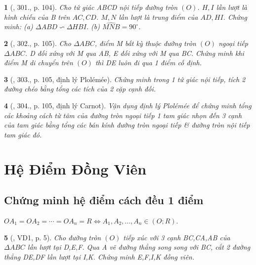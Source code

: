 \documentclass{article}
\newtheorem{baitoan}{}
\begin{document}
\begin{baitoan}[\cite{Binh_Toan_9_tap_2}, 301., p. 104]
	Cho tứ giác ABCD nội tiếp đường tròn $(O)$. $H,I$ lần lượt là hình chiếu của B trên $AC,CD$. $M,N$ lần lượt là trung điểm của $AD,HI$. Chứng minh: (a) $\Delta ABD\backsim\Delta HBI$. (b) $\widehat{MNB} = 90^\circ$.
\end{baitoan}

\begin{baitoan}[\cite{Binh_Toan_9_tap_2}, 302., p. 105]
	Cho $\Delta ABC$, điểm M bất kỳ thuộc đường tròn $(O)$ ngoại tiếp $\Delta ABC$. D đối xứng với M qua AB, E đối xứng với M qua BC. Chứng minh khi điểm M di chuyển trên $(O)$ thì DE luôn đi qua 1 điểm cố định.
\end{baitoan}

\begin{baitoan}[\cite{Binh_Toan_9_tap_2}, 303., p. 105, định lý Plol\'em\'ee]
	Chứng minh trong 1 tứ giác nội tiếp, tích 2 đường chéo bằng tổng các tích của 2 cặp cạnh đối.
\end{baitoan}

\begin{baitoan}[\cite{Binh_Toan_9_tap_2}, 304., p. 105, định lý Carnot]
	Vận dụng định lý Plol\'em\'ee để chứng minh tổng các khoảng cách từ tâm của đường tròn ngoại tiếp 1 tam giác nhọn đến 3 cạnh của tam giác bằng tổng các bán kính đường tròn ngoại tiếp \& đường tròn nội tiếp tam giác đó.
\end{baitoan}


\section{Hệ Điểm Đồng Viên}

\subsection{Chứng minh hệ điểm cách đều 1 điểm}
$OA_1 = OA_2 = \cdots = OA_n = R\Leftrightarrow A_1,A_2,\ldots,A_n\in(O;R)$.

\begin{baitoan}[\cite{Thu_Chung_Viet_Minh_circ}, VD1, p. 5]
	Cho đường tròn $(O)$ tiếp xúc với 3 cạnh BC,CA,AB của $\Delta ABC$ lần lượt tại D,E,F. Qua A vẽ đường thẳng song song với BC, cắt 2 đường thẳng DE,DF lần lượt tại I,K. Chứng minh E,F,I,K đồng viên.
\end{baitoan}
\end{document}
